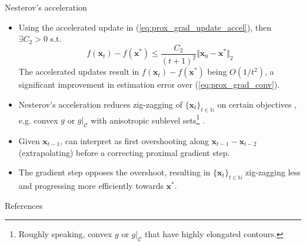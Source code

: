 \documentclass{beamer}
\numberwithin{equation}{section}
\newcommand{\aref}[1]{\alert{\ref{#1}}}
\begin{document}
\begin{frame}{Nesterov's acceleration}
    \begin{itemize}
        \item
        Using the accelerated update in (\aref{eq:prox_grad_update_accel}),
        then $ \exists C_2 > 0 $ s.t. \cite{stat_learn_sparsity}
        \begin{equation} \label{eq:prox_grad_accel_conv}
            f(\mathbf{x}_t) - f(\mathbf{x}^*) \le \frac{C_2}{(t + 1)^2}
            \Vert\mathbf{x}_0 - \mathbf{x}^*\Vert_2
        \end{equation}
        The accelerated updates result in $ f(\mathbf{x}_t) - f(\mathbf{x}^*) $
        being $ O(1 / t^2) $, a significant improvement in estimation error
        over (\aref{eq:prox_grad_conv}).

        \item
        Nesterov's acceleration reduces zig-zagging of
        $ \{\mathbf{x}_t\}_{t \in \mathbb{N}} $ on certain objectives
        \cite{stat_learn_sparsity}, e.g. convex $ g $ or $ g|_\mathcal{C} $
        with anisotropic sublevel sets\footnote{
            Roughly speaking, convex $ g $ or $ g|_\mathcal{C} $ that have
            highly elongated contours.
        } \cite{bv_convex_opt}.

        \item
        Given $ \mathbf{x}_{t - 1} $, can interpret as first overshooting
        along $ \mathbf{x}_{t - 1} - \mathbf{x}_{t - 2} $ (extrapolating)
        before a correcting proximal gradient step.

        \item
        The gradient step opposes the overshoot, resulting in
        $ \{\mathbf{x}_t\}_{t \in \mathbb{N}} $ zig-zagging less and
        progressing more efficiently towards $ \mathbf{x}^* $.
    \end{itemize}

    \medskip
\end{frame}

\begin{frame}{References}
    
    
\end{frame}
\end{document}
